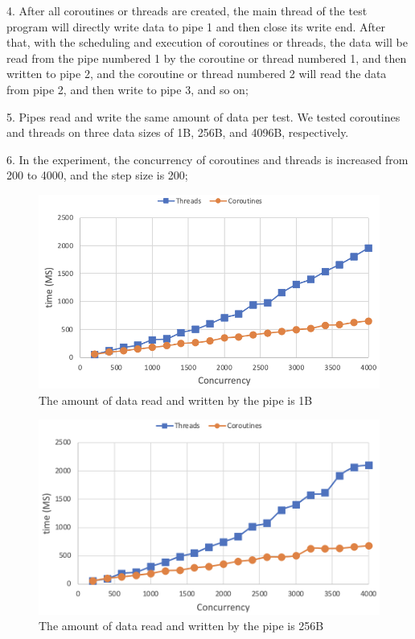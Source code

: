 \documentclass[10pt]{article}
\begin{document}
4. After all coroutines or threads are created, the main thread of the test program will directly write data to pipe 1 and then close its write end. After that, with the scheduling and execution of coroutines or threads, the data will be read from the pipe numbered 1 by the coroutine or thread numbered 1, and then written to pipe 2, and the coroutine or thread numbered 2 will read the data from pipe 2, and then write to pipe 3, and so on;

5. Pipes read and write the same amount of data per test. We tested coroutines and threads on three data sizes of 1B, 256B, and 4096B, respectively.

6. In the experiment, the concurrency of coroutines and threads is increased from 200 to 4000, and the step size is 200;

\begin{figure}[ht]
\begin{center}
\centerline{\includegraphics[width=\columnwidth]{1B.png}}
\caption{The amount of data read and written by the pipe is 1B}
\label{1B}
\end{center}
\end{figure}

\begin{figure}[ht]
\begin{center}
\centerline{\includegraphics[width=\columnwidth]{256B.png}}
\caption{The amount of data read and written by the pipe is 256B}
\label{256B}
\end{center}
\end{figure}
\end{document}
